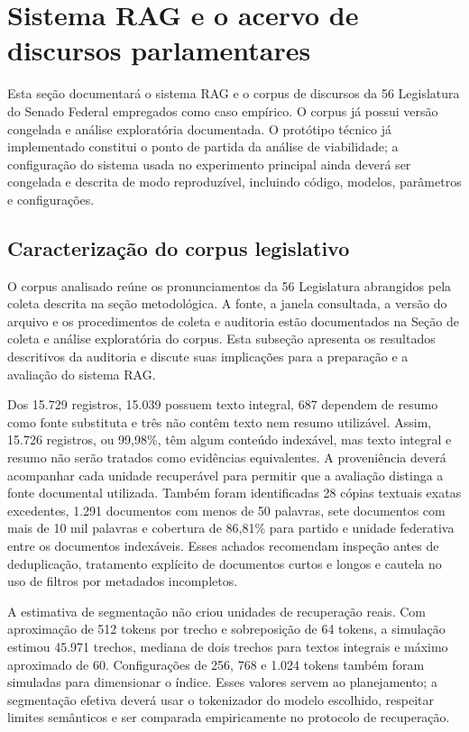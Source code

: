 \section{Sistema RAG e o acervo de discursos parlamentares}\label{sec:caso}

Esta seção documentará o sistema RAG e o corpus de discursos da 56\textordfeminine{} Legislatura do
Senado Federal empregados como caso empírico. O corpus já possui versão congelada e análise exploratória
documentada. O protótipo técnico já implementado constitui o ponto de partida da análise de viabilidade; a
configuração do sistema usada no experimento principal ainda deverá ser congelada e descrita de modo
reproduzível, incluindo código, modelos, parâmetros e configurações.

\subsection{Caracterização do corpus legislativo}\label{sec:caracterizacao-corpus}

O corpus analisado reúne os pronunciamentos da 56\textordfeminine{} Legislatura abrangidos pela coleta descrita na seção metodológica. A fonte, a janela consultada, a versão do arquivo e os procedimentos de coleta e auditoria estão documentados na Seção de coleta e análise exploratória do corpus. Esta subseção apresenta os resultados descritivos da auditoria e discute suas implicações para a preparação e a avaliação do sistema RAG.

Dos 15.729 registros, 15.039 possuem texto integral, 687 dependem de resumo como fonte substituta e três não contêm texto nem resumo utilizável. Assim, 15.726 registros, ou 99,98\%, têm algum conteúdo indexável, mas texto integral e resumo não serão tratados como evidências equivalentes. A proveniência deverá acompanhar cada unidade recuperável para permitir que a avaliação distinga a fonte documental utilizada. Também foram identificadas 28 cópias textuais exatas excedentes, 1.291 documentos com menos de 50 palavras, sete documentos com mais de 10 mil palavras e cobertura de 86,81\% para partido e unidade federativa entre os documentos indexáveis. Esses achados recomendam inspeção antes de deduplicação, tratamento explícito de documentos curtos e longos e cautela no uso de filtros por metadados incompletos.

A estimativa de segmentação não criou unidades de recuperação reais. Com aproximação de 512 tokens por trecho e sobreposição de 64 tokens, a simulação estimou 45.971 trechos, mediana de dois trechos para textos integrais e máximo aproximado de 60. Configurações de 256, 768 e 1.024 tokens também foram simuladas para dimensionar o índice. Esses valores servem ao planejamento; a segmentação efetiva deverá usar o tokenizador do modelo escolhido, respeitar limites semânticos e ser comparada empiricamente no protocolo de recuperação.

